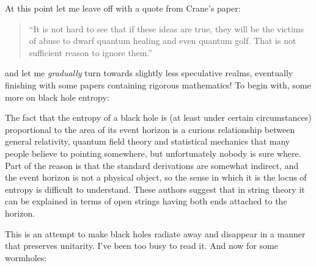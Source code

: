 \documentclass{article}
\def\tightlist{}
\renewcommand{\texttt}[1]{%
  \begingroup
  \ttfamily
  \begingroup\lccode`~=`/\lowercase{\endgroup\def~}{/\discretionary{}{}{}}%
  \begingroup\lccode`~=`[\lowercase{\endgroup\def~}{[\discretionary{}{}{}}%
  \begingroup\lccode`~=`.\lowercase{\endgroup\def~}{.\discretionary{}{}{}}%
  \catcode`/=\active\catcode`[=\active\catcode`.=\active
  \scantokens{#1\noexpand}%
  \endgroup
}
\begin{document}
At this point let me leave off with a quote from Crane's paper:

\begin{quote}
``It is not hard to see that if these ideas are true, they will be the
victims of abuse to dwarf quantum healing and even quantum golf. That is
not sufficient reason to ignore them.''
\end{quote}

and let me \emph{gradually} turn towards slightly less speculative
realms, eventually finishing with some papers containing rigorous
mathematics! To begin with, some more on black hole entropy:


The fact that the entropy of a black hole is (at least under certain
circumstances) proportional to the area of its event horizon is a
curious relationship between general relativity, quantum field theory
and statistical mechanics that many people believe to pointing
somewhere, but unfortunately nobody is sure where. Part of the reason is
that the standard derivations are somewhat indirect, and the event
horizon is not a physical object, so the sense in which it is the locus
of entropy is difficult to understand. These authors suggest that in
string theory it can be explained in terms of open strings having both
ends attached to the horizon.


This is an attempt to make black holes radiate away and disappear in a
manner that preserves unitarity. I've been too busy to read it. And now
for some wormholes:
\end{document}
